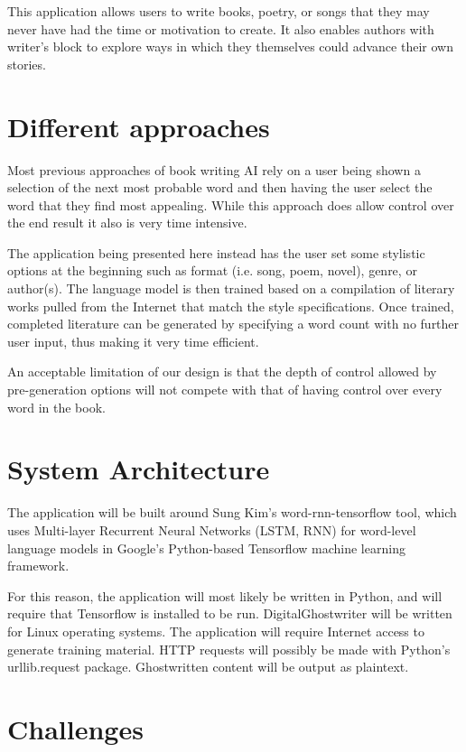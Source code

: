 \documentclass[12pt]{article}
\begin{document}
This application allows users to write books, poetry, or songs that they may never have had the time or motivation to create. It also enables authors with writer's block to explore ways in which they themselves could advance their own stories.

\section{Different approaches}

Most previous approaches of book writing AI rely on a user being shown a selection of the next most probable word and then having the user select the word that they find most appealing. While this approach does allow control over the end result it also is very time intensive.\cite{JapaneseAIWritesaNovel}

The application being presented here instead has the user set some stylistic options at the beginning such as format (i.e. song, poem, novel), genre, or author(s). The language model is then trained based on a compilation of literary works pulled from the Internet that match the style specifications. Once trained, completed literature can be generated by specifying a word count with no further user input, thus making it very time efficient.

An acceptable limitation of our design is that the depth of control allowed by pre-generation options will not compete with that of having control over every word in the book.

\section{System Architecture}

The application will be built around Sung Kim's word-rnn-tensorflow tool, which uses Multi-layer Recurrent Neural Networks (LSTM, RNN) for word-level language models in Google's Python-based Tensorflow machine learning framework.\cite{WordRNNTensorflow}

For this reason, the application will most likely be written in Python, and will require that Tensorflow is installed to be run. DigitalGhostwriter will be written for Linux operating systems. The application will require Internet access to generate training material. HTTP requests will possibly be made with Python's urllib.request package. Ghostwritten content will be output as plaintext.

\section{Challenges}
\end{document}
